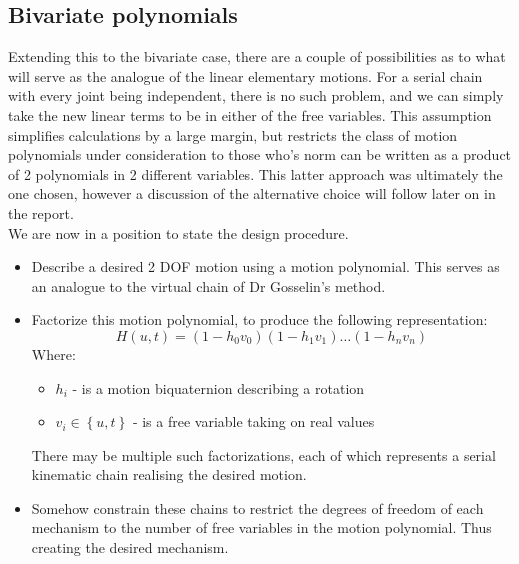 \subsection{Bivariate polynomials}
Extending this to the bivariate case, there are a couple of possibilities as to what will serve as the analogue of the linear elementary motions. For a serial chain with every joint being independent, there is no such problem, and we can simply take the new linear terms to be in either of the free variables. This assumption simplifies calculations by a large margin, but restricts the class of motion polynomials under consideration to those who's norm can be written as a product of 2 polynomials in 2 different variables. This latter approach was ultimately the one chosen, however a discussion of the alternative choice will follow later on in the report.\\
We are now in a position to state the design procedure.
\begin{itemize}
    \item Describe a desired 2 DOF motion using a motion polynomial. This serves as an analogue to the virtual chain of Dr Gosselin's method\cite{gosselin}.
    \item Factorize this motion polynomial, to produce the following representation:
        \begin{equation}
    H(u,t) = (1-h_0 v_0)(1-h_1 v_1)\dots(1-h_nv_n)
        \end{equation}
Where:
\begin{itemize}
        \item $h_i$ - is a motion biquaternion describing a rotation
        \item  $v_i \in \left\{ u, t \right\}$ - is a free variable taking on real values       
\end{itemize}
There may be multiple such factorizations, each of which represents a serial kinematic chain realising the desired motion.
\item Somehow constrain these chains to restrict the degrees of freedom of each mechanism to the number of free variables in the motion polynomial. Thus creating the desired mechanism.
\end{itemize}


